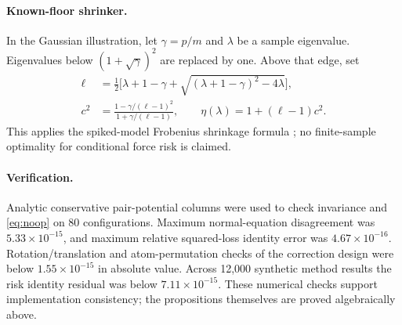 \documentclass[11pt]{article}
\begin{document}
\paragraph{Known-floor shrinker.}
In the Gaussian illustration, let $\gamma=p/m$ and $\lambda$ be a sample
eigenvalue. Eigenvalues below $(1+\sqrt\gamma)^2$ are replaced by one. Above that
edge, set
\begin{align}
 \ell&=\tfrac12\bigl[\lambda+1-\gamma+
 \sqrt{(\lambda+1-\gamma)^2-4\lambda}\bigr],\\
 c^2&=\frac{1-\gamma/(\ell-1)^2}{1+\gamma/(\ell-1)},\qquad
 \eta(\lambda)=1+(\ell-1)c^2.
\end{align}
This applies the spiked-model Frobenius shrinkage formula
\citep{donoho2017}; no finite-sample optimality for conditional force risk is claimed.

\paragraph{Verification.}
Analytic conservative pair-potential columns were used to check invariance and
\eqref{eq:noop} on 80 configurations. Maximum normal-equation disagreement was
$5.33\times10^{-15}$, and maximum relative squared-loss identity error was
$4.67\times10^{-16}$. Rotation/translation and atom-permutation checks of the
correction design were below $1.55\times10^{-15}$ in absolute value. Across
12,000 synthetic method results the risk identity residual was below
$7.11\times10^{-15}$. These numerical checks support implementation consistency;
the propositions themselves are proved algebraically above.



\end{document}
